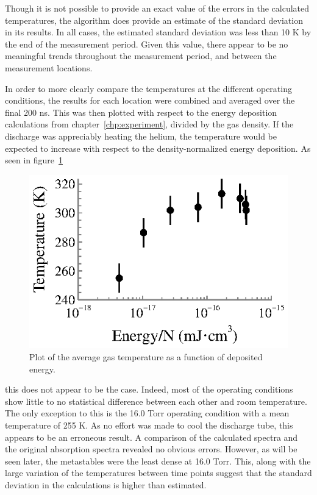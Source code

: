 Though it is not possible to provide an exact value of the errors in the
calculated temperatures, the algorithm does provide an estimate of the standard
deviation in its results. In all cases, the estimated standard deviation was less
than 10 K by the end of the measurement period. Given this value, there appear
to be no meaningful trends throughout the measurement period, and between the
measurement locations.

In order to more clearly compare the temperatures at the different operating
conditions, the results for each location were combined and averaged over the
final 200 ns. This was then plotted with respect to the energy deposition
calculations from chapter~\ref{chp:experiment}, divided by the gas density. If
the discharge was appreciably heating the helium, the temperature would be
expected to increase with respect to the density-normalized energy deposition.
As seen in figure~\ref{fig:tvp}
\begin{figure}
  \centering
  \includegraphics{./chapters/metastables/figures/tvp.eps}
  \caption{Plot of the average gas temperature as a function of deposited
  energy.}
  \label{fig:tvp}
\end{figure}
this does not appear to be the case. Indeed, most of the operating conditions
show little to no statistical difference between each other and room
temperature. The only exception to this is the 16.0 Torr operating condition
with a mean temperature of 255 K. As no effort was made to cool the discharge
tube, this appears to be an erroneous result. A comparison of the calculated
spectra and the original absorption spectra revealed no obvious errors. However,
as will be seen later, the metastables were the least dense at 16.0 Torr. This,
along with the large variation of the temperatures between time points suggest
that the standard deviation in the calculations is higher than estimated. 

